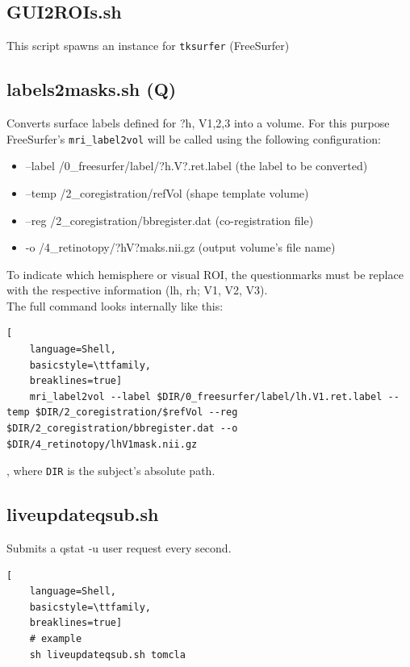 \documentclass[12pt,a4paper]{scrartcl}
\begin{document}
\subsection{GUI2ROIs.sh}
\label{sh:GUI2ROI}
This script spawns an instance for \texttt{tksurfer} (FreeSurfer)\\

\subsection{labels2masks.sh (Q)}
\label{sh:lbl2msk}
Converts surface labels defined for ?h, V1,2,3 into a volume. For this purpose FreeSurfer's \texttt{mri\_label2vol} will be called using the following configuration:
\begin{itemize}
  \item --label /0\_freesurfer/label/?h.V?.ret.label (the label to be converted)
  \item --temp /2\_coregistration/refVol (shape template volume)
  \item --reg /2\_coregistration/bbregister.dat (co-registration file)
  \item -o /4\_retinotopy/?hV?maks.nii.gz (output volume's file name)
\end{itemize}

To indicate which hemisphere or visual ROI, the questionmarks must be replace with the respective information (lh, rh; V1, V2, V3).\\

The full command looks internally like this:
\begin{lstlisting}[
    language=Shell,
    basicstyle=\ttfamily,
    breaklines=true]
    mri_label2vol --label $DIR/0_freesurfer/label/lh.V1.ret.label --temp $DIR/2_coregistration/$refVol --reg $DIR/2_coregistration/bbregister.dat --o $DIR/4_retinotopy/lhV1mask.nii.gz
\end{lstlisting}
, where \texttt{DIR} is the subject's absolute path.\\

\subsection{liveupdateqsub.sh}
\label{sh:liveupdate}
Submits a qstat -u user request every second.
\begin{lstlisting}[
    language=Shell,
    basicstyle=\ttfamily,
    breaklines=true]
    # example
    sh liveupdateqsub.sh tomcla
\end{lstlisting}
\end{document}
